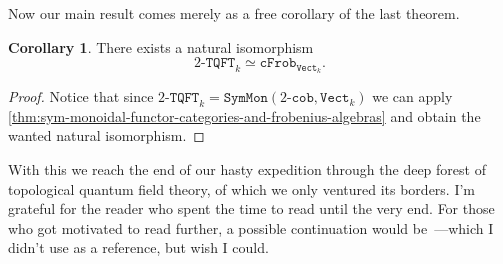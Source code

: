 \documentclass[11pt, reqno]{amsart}
\theoremstyle{definition}
\newtheorem{corollary}[theorem]{Corollary}
\newcommand{\iso}{\simeq}
\newcommand{\catfont}{\texttt}
\newcommand{\Vect}{{\catfont{Vect}}}        %
\newcommand{\Cob}[1]{{#1}\text{-}{\catfont{cob}}} %
\newcommand{\tqft}[1]{{#1}\text{-}{\catfont{TQFT}}} %
\newcommand{\cFrob}{{\catfont{cFrob}}} %
\newcommand{\SymMon}{{\catfont{SymMon}}} %
\begin{document}
Now our main result comes merely as a free corollary of the last theorem.

\begin{corollary}
\label{cor:equivalence-2tqft-commutative-frobenius}
There exists a natural isomorphism
\[
\tqft{2}_k \iso \cFrob_{\Vect_k}.
\]
\end{corollary}

\begin{proof}
Notice that since \(\tqft{2}_k = \SymMon(\Cob 2, \Vect_k)\) we can apply
\cref{thm:sym-monoidal-functor-categories-and-frobenius-algebras} and obtain the
wanted natural isomorphism.
\end{proof}

With this we reach the end of our hasty expedition through the deep forest of
topological quantum field theory, of which we only ventured its borders. I'm
grateful for the reader who spent the time to read until the very end. For those
who got motivated to read further, a possible continuation would
be~\cite{lurie-tqft}---which I didn't use as a reference, but wish I could.

\printbibliography
\end{document}
